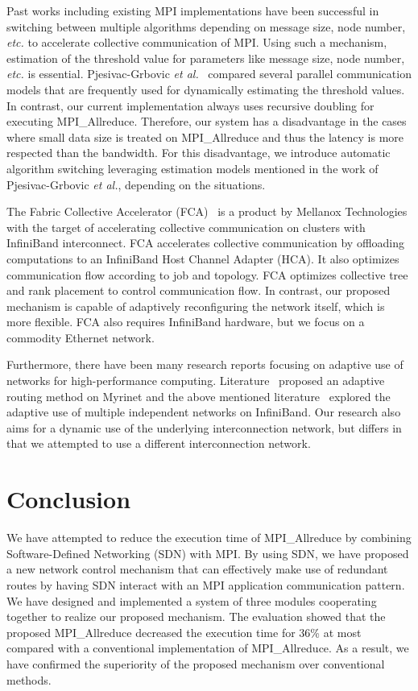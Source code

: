 Past works including existing MPI implementations have been successful
in switching between multiple algorithms depending on message size, node
number, \emph{etc.} to accelerate collective communication of MPI\@. Using
such a mechanism, estimation of the threshold value for parameters like
message size, node number, \emph{etc.} is essential. Pjesivac-Grbovic \emph{et
al.}~\autocite{PjesivacGrbovic} compared several parallel communication models
that are frequently used for dynamically estimating the threshold values. In
contrast, our current implementation always uses recursive doubling for
executing MPI\_Allreduce. Therefore, our system has a disadvantage in the
cases where small data size is treated on MPI\_Allreduce and thus the latency
is more respected than the bandwidth. For this disadvantage, we introduce
automatic algorithm switching leveraging estimation models mentioned in the
work of Pjesivac-Grbovic \emph{et al.}, depending on the situations.

The Fabric Collective Accelerator (FCA)~\autocite{fca} is a product by
Mellanox Technologies with the target of accelerating collective
communication on clusters with InfiniBand interconnect. FCA accelerates
collective communication by offloading computations to an InfiniBand
Host Channel Adapter (HCA). It also optimizes communication flow
according to job and topology. FCA optimizes collective tree and rank
placement to control communication flow. In contrast, our proposed
mechanism is capable of adaptively reconfiguring the network itself,
which is more flexible. FCA also requires InfiniBand hardware, but we
focus on a commodity Ethernet network.

Furthermore, there have been many research reports focusing on adaptive
use of networks for high-performance computing. Literature~\autocite{Geoffray2008}
proposed an adaptive routing method on Myrinet and the above mentioned
literature~\autocite{Jiuxing2004} explored the adaptive use of multiple
independent networks on InfiniBand. Our research also aims for a dynamic use
of the underlying interconnection network, but differs in that we attempted to
use a different interconnection network.

\section{Conclusion}\label{sec:iii-conclusion}

We have attempted to reduce the execution time of
MPI\_Allreduce by combining Software-Defined Networking (SDN)
with MPI\@. By using SDN, we have proposed a new network control mechanism
that can effectively make use of redundant routes by having SDN interact
with an MPI application communication pattern. We have designed and
implemented a system of three modules cooperating together to realize
our proposed mechanism. The evaluation showed that the proposed
MPI\_Allreduce decreased the execution time for 36\% at most
compared with a conventional implementation of MPI\_Allreduce.
As a result, we have confirmed the superiority of the proposed mechanism
over conventional methods.

